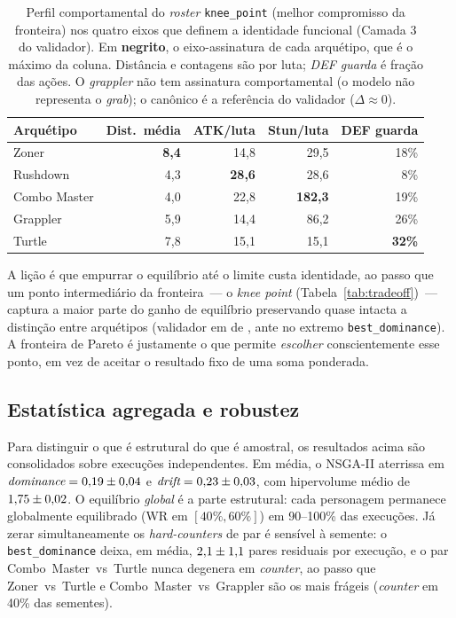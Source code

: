 \documentclass[12pt]{article}
\begin{document}
\begin{table}[ht]
\centering
\caption{Perfil comportamental do \emph{roster} \texttt{knee\_point} (melhor
compromisso da fronteira) nos quatro eixos que definem a identidade funcional
(Camada 3 do validador). Em \textbf{negrito}, o eixo-assinatura de cada arquétipo,
que é o máximo da coluna. Distância e contagens são por luta; \emph{DEF guarda} é
fração das ações. O \emph{grappler} não tem assinatura comportamental (o modelo não
representa o \emph{grab}); o canônico é a referência do validador ($\Delta\approx0$).}
\label{tab:fingerprint}
\small
\begin{tabular}{lrrrr}
\toprule
Arquétipo & Dist.\ média & ATK/luta & Stun/luta & DEF guarda \\
\midrule
Zoner        & \textbf{8{,}4} & 14{,}8          & 29{,}5           & 18\% \\
Rushdown     & 4{,}3          & \textbf{28{,}6} & 28{,}6           & 8\%  \\
Combo Master & 4{,}0          & 22{,}8          & \textbf{182{,}3} & 19\% \\
Grappler     & 5{,}9          & 14{,}4          & 86{,}2           & 26\% \\
Turtle       & 7{,}8          & 15{,}1          & 15{,}1           & \textbf{32\%} \\
\bottomrule
\end{tabular}
\end{table}

A lição é que empurrar o equilíbrio até o limite custa identidade, ao passo que um
ponto intermediário da fronteira~--- o \emph{knee point} (Tabela~\ref{tab:tradeoff})~---
captura a maior parte do ganho de equilíbrio preservando quase intacta a distinção
entre arquétipos (validador em \valKnee{} de \valTotal{}, ante \valBd{} no extremo
\texttt{best\_dominance}). A fronteira de Pareto é justamente o que permite
\emph{escolher} conscientemente esse ponto, em vez de aceitar o resultado fixo de uma
soma ponderada.

\subsection{Estatística agregada e robustez}

Para distinguir o que é estrutural do que é amostral, os resultados acima são
consolidados sobre \nSeeds{} execuções independentes. Em média, o NSGA-II aterrissa
em $\textit{dominance}=0{,}19{}\pm0{,}04{}$ e
$\textit{drift}=0{,}23{}\pm0{,}03{}$, com hipervolume médio de
$1{,}75{}\pm0{,}02{}$. O equilíbrio \emph{global} é a parte estrutural: cada
personagem permanece globalmente equilibrado (WR em $[40\%,60\%]$) em 90--100\% das
execuções. Já zerar simultaneamente os \emph{hard-counters} de par é sensível à
semente: o \texttt{best\_dominance} deixa, em média, $2{,}1{}\pm1{,}1{}$
pares residuais por execução, e o par Combo~Master~vs~Turtle nunca degenera em
\emph{counter}, ao passo que Zoner~vs~Turtle e Combo~Master~vs~Grappler são os mais
frágeis (\emph{counter} em 40\% das sementes).
\end{document}
